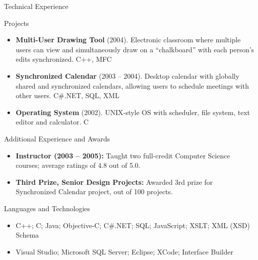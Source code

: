 \documentclass[]{georgekircv}
\begin{document}
	\begin{cvsection}{Technical Experience}
		\begin{cvsubsection}{Projects}{}{}
			\begin{itemize}
				\item \textbf{Multi-User Drawing Tool} (2004). Electronic classroom where multiple users can view and simultaneously draw on a “chalkboard” with each person’s edits synchronized.  C++, MFC
				\item \textbf{Synchronized Calendar} (2003 – 2004). Desktop calendar with globally shared and synchronized calendars, allowing users to schedule meetings with other users.  C\#.NET, SQL, XML
				\item \textbf{Operating System} (2002).  UNIX-style OS with scheduler, file system, text editor and calculator. C
			\end{itemize}
		\end{cvsubsection}
	\end{cvsection}
	
	\begin{cvsection}{Additional Experience and Awards}
		\begin{cvsubsection}{}{}{}	
			\begin{itemize}
				\item \textbf{Instructor (2003 – 2005):} Taught two full-credit Computer Science courses; average ratings of 4.8 out of 5.0.
				\item \textbf{Third Prize, Senior Design Projects:} Awarded 3rd prize for Synchronized Calendar project, out of 100 projects.
			\end{itemize}
		\end{cvsubsection}
	\end{cvsection}
	
	\begin{cvsection}{Languages and Technologies}
		\begin{cvsubsection}{}{}{}	
			\begin{itemize}
				\item C++; C; Java; Objective-C; C\#.NET; SQL; JavaScript; XSLT; XML (XSD) Schema 
				\item Visual Studio; Microsoft SQL Server; Eclipse; XCode; Interface Builder
			\end{itemize}
		\end{cvsubsection}
	\end{cvsection}
	
\end{document}
